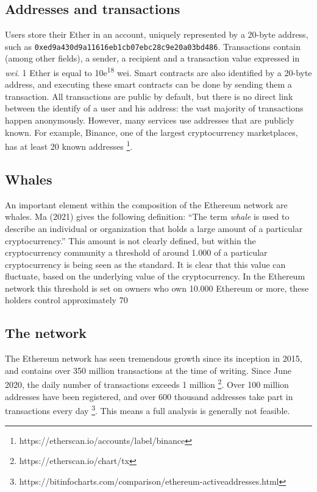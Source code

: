 \documentclass[10pt,a4paper]{article}
\begin{document}
\begin{multicols}{2}
\subsection{Addresses and transactions}
Users store their Ether in an account, uniquely represented by a 20-byte address, such as \texttt{0xed9a430d9a11616eb1cb07ebc28c9e20a03bd486}. Transactions contain (among other fields), a sender, a recipient and a transaction value expressed in \textit{wei}. 1 Ether is equal to 10e\textsuperscript{18} wei. Smart contracts are also identified by a 20-byte address, and executing these smart contracts can be done by sending them a transaction. All transactions are public by default, but there is no direct link between the identify of a user and his address: the vast majority of transactions happen anonymously. However, many services use addresses that are publicly known. For example, Binance, one of the largest cryptocurrency marketplaces, has at least 20 known addresses \footnote{https://etherscan.io/accounts/label/binance}.
\subsection{Whales}
An important element within the composition of the Ethereum network are whales. Ma (2021) gives the following definition: “The term \textit {whale} is used to describe an individual or organization that holds a large amount of a particular cryptocurrency.” This amount is not clearly defined, but within the cryptocurrency community a threshold of around 1.000 of a particular cryptocurrency is being seen as the standard. It is clear that this value can fluctuate, based on the underlying value of the cryptocurrency. In the Ethereum network this threshold is set on owners who own 10.000 Ethereum or more, these holders control approximately 70%


\subsection{The network}
The Ethereum network has seen tremendous growth since its inception in 2015, and contains over 350 million transactions at the time of writing. Since June 2020, the daily number of transactions exceeds 1 million \footnote{https://etherscan.io/chart/tx}. Over 100 million addresses have been registered, and over 600 thousand addresses take part in transactions every day \footnote{https://bitinfocharts.com/comparison/ethereum-activeaddresses.html}. This means a full analysis is generally not feasible.


\end{multicols}
\end{document}
